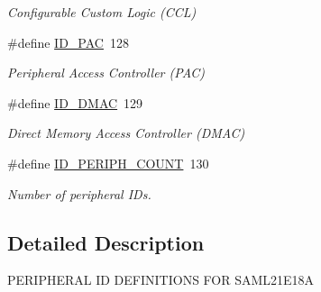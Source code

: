\begin{DoxyCompactItemize}
\begin{DoxyCompactList}\small\item\em Configurable Custom Logic (C\+C\+L) \end{DoxyCompactList}\item 
\hypertarget{group___s_a_m_l21_e18_a__id_ga1a7ef008badcb8b13477fd4d9f39c907}{}\#define \hyperlink{group___s_a_m_l21_e18_a__id_ga1a7ef008badcb8b13477fd4d9f39c907}{I\+D\+\_\+\+P\+A\+C}~128\label{group___s_a_m_l21_e18_a__id_ga1a7ef008badcb8b13477fd4d9f39c907}

\begin{DoxyCompactList}\small\item\em Peripheral Access Controller (P\+A\+C) \end{DoxyCompactList}\item 
\hypertarget{group___s_a_m_l21_e18_a__id_ga82f75d497cb286bddbeb5a4cc7acdf6c}{}\#define \hyperlink{group___s_a_m_l21_e18_a__id_ga82f75d497cb286bddbeb5a4cc7acdf6c}{I\+D\+\_\+\+D\+M\+A\+C}~129\label{group___s_a_m_l21_e18_a__id_ga82f75d497cb286bddbeb5a4cc7acdf6c}

\begin{DoxyCompactList}\small\item\em Direct Memory Access Controller (D\+M\+A\+C) \end{DoxyCompactList}\item 
\hypertarget{group___s_a_m_l21_e18_a__id_gad0762589e782b5eca161d9d344306da7}{}\#define \hyperlink{group___s_a_m_l21_e18_a__id_gad0762589e782b5eca161d9d344306da7}{I\+D\+\_\+\+P\+E\+R\+I\+P\+H\+\_\+\+C\+O\+U\+N\+T}~130\label{group___s_a_m_l21_e18_a__id_gad0762589e782b5eca161d9d344306da7}

\begin{DoxyCompactList}\small\item\em Number of peripheral I\+Ds. \end{DoxyCompactList}\end{DoxyCompactItemize}


\subsection{Detailed Description}
P\+E\+R\+I\+P\+H\+E\+R\+A\+L I\+D D\+E\+F\+I\+N\+I\+T\+I\+O\+N\+S F\+O\+R S\+A\+M\+L21\+E18\+A 